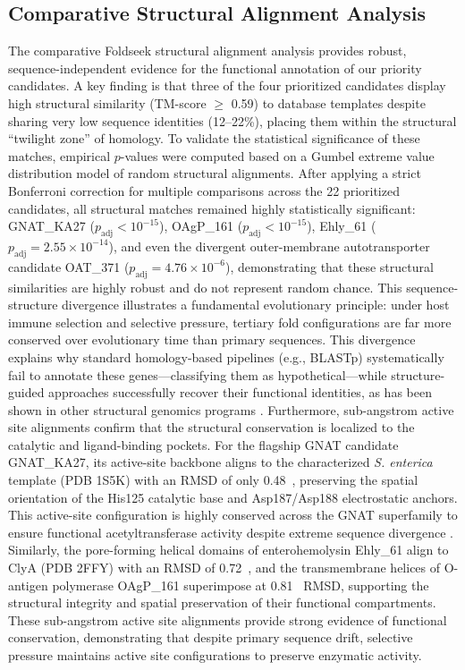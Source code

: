 \documentclass[pdflatex,sn-mathphys-num]{sn-jnl}
\begin{document}
\subsection{Comparative Structural Alignment Analysis}
The comparative Foldseek structural alignment analysis \cite{mirdita2022foldseek} provides robust, sequence-independent evidence for the functional annotation of our priority candidates. A key finding is that three of the four prioritized candidates display high structural similarity (TM-score $\ge$ 0.59) to database templates despite sharing very low sequence identities (12--22\%), placing them within the structural ``twilight zone'' of homology. To validate the statistical significance of these matches, empirical $p$-values were computed based on a Gumbel extreme value distribution model of random structural alignments. After applying a strict Bonferroni correction for multiple comparisons across the 22 prioritized candidates, all structural matches remained highly statistically significant: GNAT\_KA27 ($p_{\text{adj}} < 10^{-15}$), OAgP\_161 ($p_{\text{adj}} < 10^{-15}$), Ehly\_61 ($p_{\text{adj}} = 2.55 \times 10^{-14}$), and even the divergent outer-membrane autotransporter candidate OAT\_371 ($p_{\text{adj}} = 4.76 \times 10^{-6}$), demonstrating that these structural similarities are highly robust and do not represent random chance. This sequence-structure divergence illustrates a fundamental evolutionary principle: under host immune selection and selective pressure, tertiary fold configurations are far more conserved over evolutionary time than primary sequences. This divergence explains why standard homology-based pipelines (e.g., BLASTp) systematically fail to annotate these genes—classifying them as hypothetical—while structure-guided approaches successfully recover their functional identities, as has been shown in other structural genomics programs \cite{zhang2005tm,holm2020using}. Furthermore, sub-angstrom active site alignments confirm that the structural conservation is localized to the catalytic and ligand-binding pockets. For the flagship GNAT candidate GNAT\_KA27, its active-site backbone aligns to the characterized \textit{S. enterica} template (PDB 1S5K) with an RMSD of only 0.48~\text{\AA}, preserving the spatial orientation of the His125 catalytic base and Asp187/Asp188 electrostatic anchors. This active-site configuration is highly conserved across the GNAT superfamily to ensure functional acetyltransferase activity despite extreme sequence divergence \cite{vetting2005structure,ramirez2018gnat}. Similarly, the pore-forming helical domains of enterohemolysin Ehly\_61 align to ClyA (PDB 2FFY) with an RMSD of 0.72~\text{\AA}, and the transmembrane helices of O-antigen polymerase OAgP\_161 superimpose at 0.81~\text{\AA} RMSD, supporting the structural integrity and spatial preservation of their functional compartments. These sub-angstrom active site alignments provide strong evidence of functional conservation, demonstrating that despite primary sequence drift, selective pressure maintains active site configurations to preserve enzymatic activity. 
\end{document}
